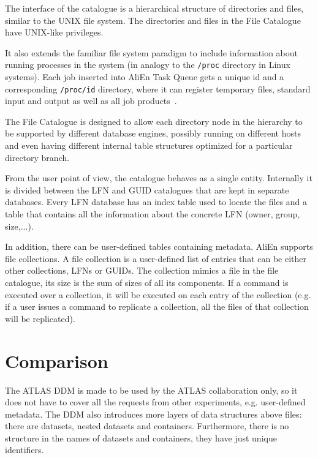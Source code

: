 The interface of the catalogue is a hierarchical structure of directories and
files, similar to the UNIX file system. The directories and files in the File
Catalogue have UNIX-like privileges.

It also extends the familiar file system paradigm to include information about
running processes in the system (in analogy to the \texttt{/proc} directory in Linux
systems). Each job inserted into AliEn Task Queue gets a unique id and a
corresponding \texttt{/proc/id} directory, where it can register temporary files,
standard input and output as well as all job products~\cite{AliEn1}.

The File Catalogue is designed to allow each directory node in the hierarchy to
be supported by different database engines, possibly running on different hosts
and even having different internal table structures optimized for a particular
directory branch. 

From the user point of view, the catalogue behaves as a single entity. Internally
it is divided between the LFN and GUID catalogues that are kept in separate
databases. Every LFN database has an index table used to locate the files and
a table that contains all the information about the concrete LFN (owner, group,
size,...).

In addition, there can be user-defined tables containing metadata.
AliEn supports file collections.  A file collection is a user-defined list of
entries that can be either other collections, LFNs or GUIDs. The collection
mimics a file in the file catalogue, its size is the sum of sizes of
all its components. If a command is executed over a collection, it will be
executed on each entry of the collection (e.g. if a user issues a command to
replicate a collection, all the files of that collection will be replicated).

\section{Comparison}

The ATLAS DDM is made to be used by the ATLAS collaboration only, so it does not have to cover all the 
requests from other experiments, e.g. user-defined metadata. The DDM also introduces more layers of data 
structures above files: there are datasets, nested datasets and containers. Furthermore, 
there is no structure in the names of datasets and containers, they have just unique identifiers. 

